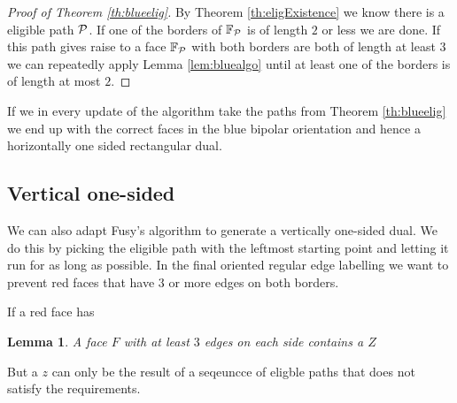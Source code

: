 \documentclass[a4paper]{article}
\newtheorem{lemma}[thrm]{Lemma}
\theoremstyle{definition}
\newcommand{\F}{\mathbb{F}}
\begin{document}
\begin{proof}[Proof of Theorem \ref{th:blueelig}]
By Theorem \ref{th:eligExistence} we know there is a eligible path $\P$. If one of the borders of $\F_\P$ is of length $2$ or less we are done. If this path gives raise to a face $\F_\P$ with both borders are both of length at least $3$ we can repeatedly apply Lemma \ref{lem:bluealgo} until at least one of the borders is of length at most $2$. 
\end{proof}

If we in every update of the algorithm take the paths from Theorem  \ref{th:blueelig} we end up with the correct faces in the blue bipolar orientation and hence a horizontally one sided rectangular dual.

\subsection{Vertical one-sided}

We can also adapt Fusy's algorithm to generate a vertically one-sided dual. We do this by picking the eligible path with the leftmost starting point and letting it run for as long as possible. In the final oriented regular edge labelling we want to prevent red faces that have $3$ or more edges on both borders. 

If a red face has 
\begin{lemma}
A face $F$ with at least $3$ edges on each side contains a $Z$ 
\end{lemma}

But a $z$ can only be the result of a seqeuncce of eligble paths that does not satisfy the requirements. 
\end{document}
